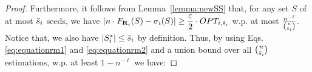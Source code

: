 \begin{proof}

Furthermore, it follows from Lemma~\ref{lemma:newSS} that, for any set $S$ of at most $\bar{s}_{i}$ seeds, we have $\left| n\cdot F_{\mathbf{R}_i}(S) - \sigma_i(S) \right| \ge \dfrac{\varepsilon}{2} \cdot OPT_{i, \tilde{s}_i}$ w.p. at most $\frac{n^{-\ell}}{\binom{n}{\bar{s}_{i}}}$. Notice that, we also have $|S^*_i| \le \bar{s}_{i}$ by definition. Thus, by using Eqs.\ref{eq:equationrm1} and \ref{eq:equationrm2} and a union bound over all $\binom{n}{\bar{s}_{i}}$ estimations, w.p. at least $1-n^{-\ell}$ we have: 


\end{proof}
